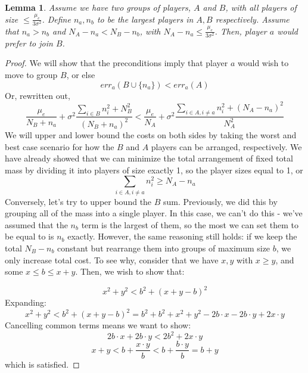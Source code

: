 \documentclass{article}
\newcommand{\cd}[0]{\cdot}
\newtheorem{lemma}{Lemma}
\newcommand{\mue}[0]{\ensuremath{\mu_e}}
\newcommand{\var}[0]{\ensuremath{\sigma^2}}
\newcommand{\ndraw}[0]{\ensuremath{n}}
\newcommand{\total}[0]{\ensuremath{N}}
\begin{document}
\begin{lemma}\label{lem:case3}
Assume we have two groups of players, $A$ and $B$, with all players of size $\leq \frac{\mue}{ 3\var}$. Define $\ndraw_a, \ndraw_b$ to be the largest players in $A, B$ respectively. Assume that $\ndraw_a > \ndraw_b$ and $\total_A -\ndraw_a < \total_B - \ndraw_b$, with  $\total_A - \ndraw_a \leq \frac{\mue}{3\var}$. Then, player $a$ would prefer to join $B$. 
\end{lemma}
\begin{proof}
We will show that the preconditions imply that player $a$ would wish to move to group $B$, or else
$$ err_a(B \cup \{\ndraw_a\}) < err_a(A) $$
Or, rewritten out, 
$$\frac{\mue}{\total_B + \ndraw_a} + \var \frac{\sum_{i \in B} \ndraw_i^2 + \total_B^2}{(\total_B + \ndraw_a)^2} < \frac{\mue}{\total_A} + \var \frac{\sum_{i \in A, i \ne a} \ndraw_i^2 + (\total_A - \ndraw_a)^2}{\total_A^2} $$
We will upper and lower bound the costs on both sides by taking the worst and best case scenario for how the $B$ and $A$ players can be arranged, respectively. We have already showed that we can minimize the total arrangement of fixed total mass by dividing it into players of size exactly 1, so
the player sizes equal to 1, or 
$$\sum_{i \in A, i \ne a} \ndraw_i^2 \geq  \total_A - \ndraw_a$$
Conversely, let's try to upper bound the $B$ sum. Previously, we did this by grouping all of the mass into a single player. In this case, we can't do this - we've assumed that the $\ndraw_b$ term is the largest of them, so the most we can set them to be equal to is $\ndraw_b$ exactly. However, the same reasoning still holds: if we keep the total $\total_B-\ndraw_b$ constant but rearrange them into groups of maximum size $b$, we only increase total cost. 
To see why, consider that we have $x, y$ with $x \geq y$, and some $x \leq b \leq x+y$. Then, we wish to show that: 

$$x^2 + y^2 < b^2 + (x+y-b)^2$$ 
Expanding: 
$$x^2 + y^2 < b^2 + (x+y-b)^2 = b^2 + b^2 + x^2 + y^2 -2b \cd x - 2 b\cd y +2 x \cd y$$
Cancelling common terms means we want to show: 
$$2b \cd x + 2 b\cd y  < 2b^2 +2 x \cd y$$
$$ x + y  < b +\frac{x \cd y}{b} < b + \frac{b \cd y}{b} = b + y$$
which is satisfied.


\end{proof}
\end{document}
